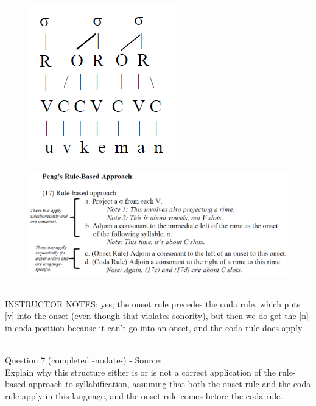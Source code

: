 \documentclass[12pt]{article}
\begin{document}
\begin{figure}[H]
\includegraphics{../images/pengrules_uvkeman_yes.png}
\end{figure}
\begin{figure}[H]
\includegraphics{../images/peng_rules.png}
\end{figure}

~\\
INSTRUCTOR NOTES: yes; the onset rule precedes the coda rule, which puts [v] into the onset (even though that violates sonority), but then we do get the [n] in coda position because it can't go into an onset, and the coda rule does apply


~\\

{\large Question 7} (completed -nodate-) - Source: \\

Explain why this structure either is or is not a correct application of the rule-based approach to syllabification, assuming that both the onset rule and the coda rule apply in this language, and the onset rule comes before the coda rule.\\
\end{document}
